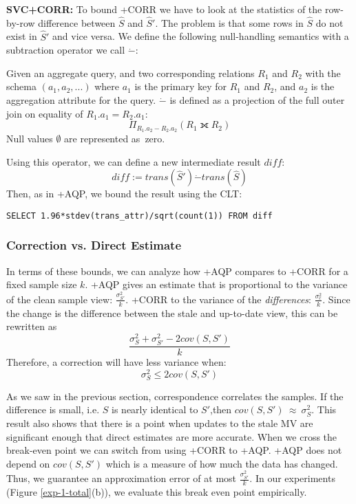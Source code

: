 \noindent\textbf{SVC+CORR: } To bound \svcnospace+CORR we have to look at the statistics of the row-by-row difference between $\widehat{S}$ and $\widehat{S}'$. The problem is that some rows in $\widehat{S}$ do not exist in $\widehat{S}'$ and vice versa. We define the following null-handling semantics with a subtraction operator we call $\dot{-}$:
\begin{definition} Given an aggregate query, and two corresponding relations $R_1$ and $R_2$ with the schema $(a_1, a_2, ...)$ where $a_1$ is the primary key for $R_1$ and $R_2$, and $a_2$ is the aggregation attribute for the query. 
$\dot{-}$ is defined as a projection of the full outer join on equality of $R_1.a_1 = R_2.a_1$: \[ \Pi_{R_1.a_2 - R_2.a_2} ( R_1 \fullouterjoin R_2 ) \]
Null values $\emptyset$ are represented as~zero.
\end{definition}
Using this operator, we can define a new intermediate result $diff$:
\[diff := trans(\widehat{S}') \dot{-} trans(\widehat{S}) \]
Then, as in \svcnospace+AQP, we bound the result using the CLT:
\begin{lstlisting}[mathescape,basicstyle={\scriptsize}]
SELECT 1.96*stdev(trans_attr)/sqrt(count(1)) FROM diff
\end{lstlisting}

\subsubsection{Correction vs. Direct Estimate}
In terms of these bounds, we can analyze how \svcnospace+AQP compares to \svcnospace+CORR for a fixed sample size $k$.
\sloppy
\svcnospace+AQP gives an estimate that is proportional to the variance of the clean sample view: 
$\frac{\sigma_{S'}^2}{k}$.
\svcnospace+CORR to the variance of the \emph{differences}: 
$\frac{\sigma_{c}^2}{k}$.
Since the change is the difference between the stale and up-to-date view, this can be rewritten as
\[\frac{\sigma_{S}^2 + \sigma_{S'}^2 - 2cov(S,S')}{k}\]
Therefore, a correction will have less variance when:
\[\sigma_{S}^2 \le 2cov(S,S')\]

As we saw in the previous section, correspondence correlates the samples.
If the difference is small, i.e. $S$ is nearly identical to $S'$,then $cov(S,S')~\approx~\sigma_{S}^2$. 
This result also shows that there is a point when updates to the stale MV are significant enough that direct estimates are more accurate.
When we cross the break-even point we can switch from using \svcnospace+CORR to \svcnospace+AQP.
\svcnospace+AQP does not depend on $cov(S,S')$ which is a measure of how much the data has changed.
Thus, we guarantee an approximation error of at most $\frac{\sigma_{S'}^2}{k}$.
In our experiments (Figure \ref{exp-1-total}(b)), we evaluate this break even point empirically. 

